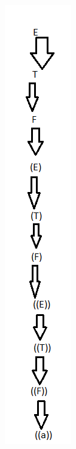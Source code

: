 \documentclass{article}
\begin{document}
\begin{enumerate}
\includegraphics[scale=0.75]{CFG2}
\end{enumerate}
\end{document}
